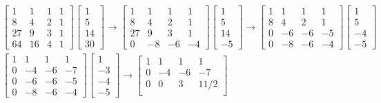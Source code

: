 \documentclass{article}
\begin{document}
\begin{gather*}
	\begin{bmatrix}
		1 & 1 & 1 & 1\\
		8 & 4 & 2 & 1\\
		27 & 9 & 3 & 1\\
		64 & 16 & 4 & 1
	\end{bmatrix}
	\begin{bmatrix}
		1\\
		5\\
		14\\
		30
	\end{bmatrix} \rightarrow
	\begin{bmatrix}
		1 & 1 & 1 & 1\\
		8 & 4 & 2 & 1\\
		27 & 9 & 3 & 1\\
		0 & -8 & -6 & -4 
	\end{bmatrix}
	\begin{bmatrix}
		1\\
		5\\
		14\\
		-5
	\end{bmatrix} \rightarrow
	\begin{bmatrix}
		1 & 1 & 1 & 1\\
		8 & 4 & 2 & 1\\
		0 & -6 & -6 & -5\\
		0 & -8 & -6 & -4 
	\end{bmatrix}
	\begin{bmatrix}
		1\\
		5\\
		-4\\
		-5
	\end{bmatrix}\\
	\begin{bmatrix}
		1 & 1 & 1 & 1\\
		0 & -4 & -6 & -7\\
		0 & -6 & -6 & -5\\
		0 & -8 & -6 & -4 
	\end{bmatrix}
	\begin{bmatrix}
		1\\
		-3\\
		-4\\
		-5
	\end{bmatrix} \rightarrow
	\begin{bmatrix}
		1 & 1 & 1 & 1\\
		0 & -4 & -6 & -7\\
		0 & 0 & 3 & 11/2\\

\end{bmatrix}
\end{gather*}
\end{document}
